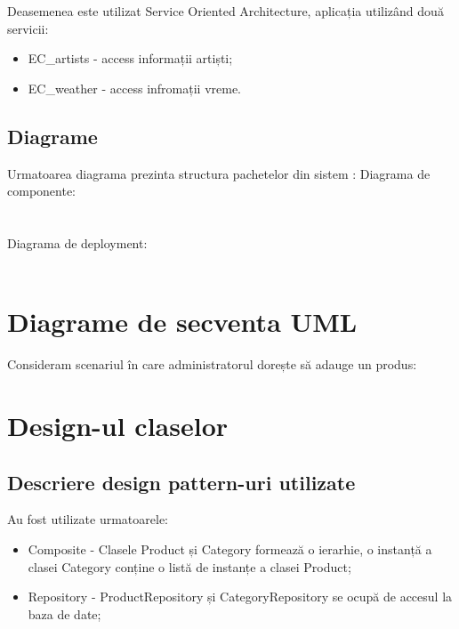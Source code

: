 \documentclass[11pt,a4paper,twoside,notitlepage]{article}
\begin{document}
Deasemenea este utilizat Service Oriented Architecture, aplicația utiliz\^{a}nd două servicii:
\begin{itemize}
	\item EC\_artists - access informații artiști;
	\item EC\_weather - access infromații vreme.
\end{itemize}


\subsection{Diagrame}

Urmatoarea diagrama prezinta structura pachetelor din sistem :
\newpage
Diagrama de componente: \\
\\
\\
Diagrama de deployment: \\
\\


\section{Diagrame de secventa UML}
Consideram scenariul în care administratorul dorește să adauge un produs: \\


\section{Design-ul claselor}

\subsection{Descriere design pattern-uri utilizate}

Au fost utilizate urmatoarele:
\begin{itemize}
	\item Composite - Clasele Product și Category formează o ierarhie, o instanță a clasei Category conține o listă de instanțe a clasei Product;
	\item Repository - ProductRepository și CategoryRepository se ocupă de accesul la baza de date;
\end{itemize}
\end{document}
